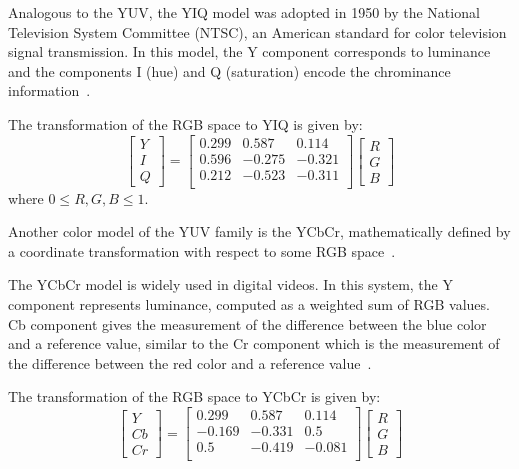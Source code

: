 Analogous to the YUV, the YIQ model was adopted in 1950 by the National Television System Committee (NTSC), an American standard for color television signal transmission. In this model, the Y component corresponds to luminance and the components I (hue) and Q (saturation) encode the chrominance information~\citep{pedrini:08}.

The transformation of the RGB space to YIQ is given by:\\
\begin{equation}
  \begin{bmatrix}
    Y \\ I \\ Q
  \end{bmatrix} = 
  \begin{bmatrix}
    0.299  &  0.587 &  0.114 \\
    0.596  & -0.275 & -0.321 \\
    0.212  & -0.523 & -0.311 \\
  \end{bmatrix}
  \begin{bmatrix}
    R \\ G \\ B
  \end{bmatrix}
\end{equation}
where $0 \leq R, G, B \leq 1$.

Another color model of the YUV family is the YCbCr, mathematically defined by a coordinate transformation with respect to some RGB space~\citep{pedrini:08}.

The YCbCr model is widely used in digital videos. In this system, the Y component represents luminance, computed as a weighted sum of RGB values. Cb component gives the measurement of the difference between the blue color and a reference value, similar to the Cr component which is the measurement of the difference between the red color and a reference value~\citep{pedrini:08}.

The transformation of the RGB space to YCbCr is given by:\\
\begin{equation}
  \begin{bmatrix}
    Y \\ Cb \\ Cr
  \end{bmatrix} = 
  \begin{bmatrix}
     0.299 &  0.587 &  0.114 \\
    -0.169 & -0.331 &  0.5   \\
     0.5   & -0.419 & -0.081 \\
  \end{bmatrix}
  \begin{bmatrix}
    R \\ G \\ B
  \end{bmatrix}
\end{equation}


